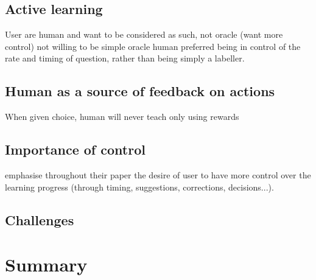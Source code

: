 
\subsection{Active learning} \label{ssec:back_active}

User are human and want to be considered as such, not oracle (want more control) not willing to be simple oracle \cite{cakmak2010designing} %
human preferred being in control of the rate and timing of question, rather than being simply a labeller.

\subsection{Human as a source of feedback on actions}
\cite{isbell2006cobot}

When given choice, human will never teach only using rewards \cite{kaochar2011towards} %


\subsection{Importance of control}

\cite{amershi2014power} emphasise throughout their paper the desire of user to have more control over the learning progress (through timing, suggestions, corrections, decisions...).


\subsection{Challenges}

	



\section{Summary}
